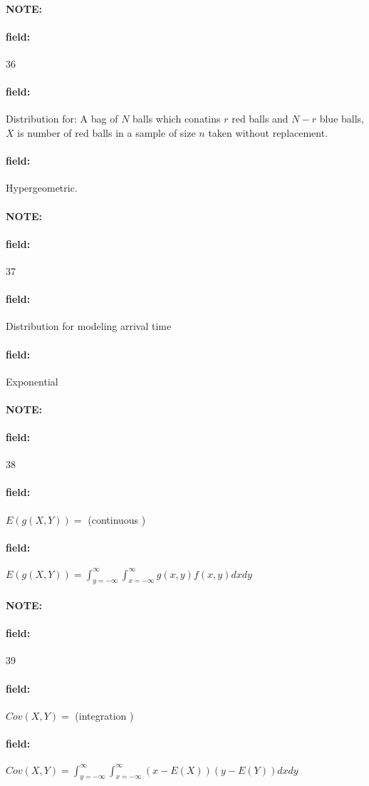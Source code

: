 \documentclass[12pt]{article}
\newenvironment{note}{\paragraph{NOTE:}}{}
\newenvironment{field}{\paragraph{field:}}{}
\begin{document}
\begin{note}
  \begin{field}
    \tiny 36
  \end{field}
  \begin{field}
    Distribution for: A bag of $N$ balls which conatins $r$ red balls and $N-r$ blue balls, $X$ is number of red balls in a sample of size $n$ taken without replacement.
  \end{field}
  \begin{field}
    Hypergeometric.
  \end{field}
\end{note}

\begin{note}
  \begin{field}
    \tiny 37
  \end{field}
  \begin{field}
    Distribution for modeling arrival time
  \end{field}
  \begin{field}
    Exponential
  \end{field}
\end{note}


\begin{note}
  \begin{field}
    \tiny 38
  \end{field}
  \begin{field}
    $E(g(X,Y)) = $ (continuous )
  \end{field}
  \begin{field}
    $E(g(X,Y)) = \int_{y = - \infty}^\infty \int_{x = -\infty}^\infty g(x,y)f(x,y)dx dy$
  \end{field}
\end{note}

\begin{note}
  \begin{field}
    \tiny 39
  \end{field}
  \begin{field}
    $Cov(X,Y) = $ (integration )
  \end{field}
  \begin{field}
    $Cov(X,Y) = \int_{y = - \infty}^\infty \int_{x = -\infty}^\infty (x - E(X))(y - E(Y))dx dy$
  \end{field}
\end{note}
\end{document}
